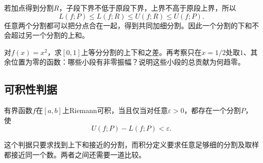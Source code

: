 若加点得到分割\(R\)，子段下界不低于原段下界，上界不高于原段上界，所以
\begin{equation*}
 L(f;P)\le L(f;R)\le U(f;R)\le U(f;P).
\end{equation*}
任意两个分割都可以把分点合在一起，得到共同加细分割。因此一个分割的下和不会超过另一个分割的上和。

\begin{example}
对\(f(x)=x^2\)，求\([0,1]\)上等分分割的上下和之差。再考察只在\(x=1/2\)处取\(1\)、其余位置为零的函数：哪些小段有非零振幅？说明这些小段的总贡献为何趋零。
\end{example}

\begingroup
\setlength{\parskip}{4pt}
\setlength{\abovedisplayskip}{10pt}
\setlength{\belowdisplayskip}{10pt}
\subsection{可积性判据}

\begin{theorem}[Darboux判据]\label{thm:calculus-darboux}
有界函数\(f\)在\([a,b]\)上Riemann可积，当且仅当对任意\(\varepsilon>0\)，都存在一个分割\(P\)，使
\begin{equation}\label{eq:calculus-darboux-criterion}
 U(f;P)-L(f;P)<\varepsilon.
\end{equation}
\end{theorem}

这个判据只要求找到上下和接近的分割，而积分定义要求任意足够细的分割及取样都接近同一个数。两者之间还需要一道比较。

